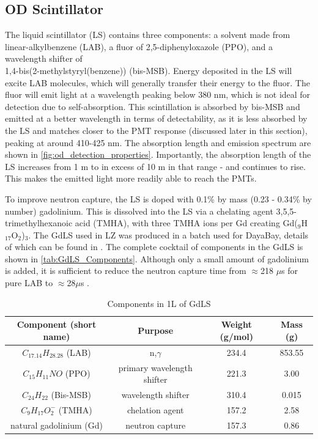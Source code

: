 

\subsection{OD Scintillator}
\par
The liquid scintillator (LS) contains three components: a solvent made from linear-alkylbenzene (LAB), a fluor of 2,5-diphenyloxazole (PPO), and a wavelength shifter of \\ 1,4-bis(2-methylstyryl(benzene)) (bis-MSB).
Energy deposited in the LS will excite LAB molecules, which will generally transfer their energy to the fluor. 
The fluor will emit light at a wavelength peaking below 380 nm, which is not ideal for detection due to self-absorption.
This scintillation is absorbed by bis-MSB and emitted at a better wavelength in terms of detectability, as it is less absorbed by the LS and matches closer to the PMT response (discussed later in this section), peaking at around 410-425 nm.
The absorption length and emission spectrum are shown in \autoref{fig:od_detection_properties}.
Importantly, the absorption length of the LS increases from 1 m to in excess of 10 m in that range - and continues to rise.
This makes the emitted light more readily able to reach the PMTs.



\par
To improve neutron capture, the LS is doped with 0.1\% by mass (0.23 - 0.34\% by number) gadolinium.
This is dissolved into the LS via a chelating agent 3,5,5-trimethylhexanoic acid (TMHA), with three TMHA ions per Gd creating Gd(${}_{9}$H${}_{17}$O${}_{2}$)${}_{3}$.
The GdLS used in LZ was produced in a batch used for DayaBay, details of which can be found in \cite{dayabay_gd_doping_ref}.
The complete cocktail of components in the GdLS is shown in \autoref{tab:GdLS_Components}.
Although only a small amount of gadolinium is added, it is sufficient to reduce the neutron capture time from $\approx$218 $\mu$s for pure LAB to $\approx$28$\mu$s \cite{ucsb_gdls_dicebox_simulations_ref}.

\begin{table}
    \centering
    \begin{tabular}{c | c | c | c}
    \hline
    {Component (short name)} & {Purpose} & {Weight (g/mol)} & {Mass (g)} \\ \hline
    $C_{17.14}H_{28.28}$ (LAB) & n,$\gamma$ & 234.4  & 853.55 \\
    $C_{15}H_{11}NO$ (PPO) & primary wavelength shifter & 221.3 & 3.00 \\
    $C_{24}H_{22}$ (Bis-MSB) & wavelength shifter & 310.4 & 0.015 \\
    $C_{9}H_{17}O^{-}_{2}$ (TMHA) & chelation agent & 157.2 & 2.58 \\
    natural gadolinium (Gd) & neutron capture & 157.3 & 0.86 
    \end{tabular}
    \caption{Components in 1L of GdLS}
    \label{tab:GdLS_Components}
\end{table} 


